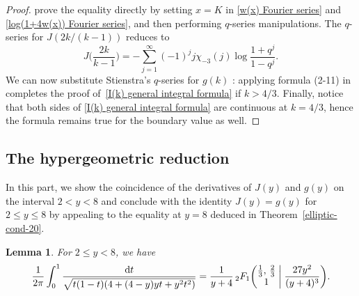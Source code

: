 \documentclass[12pt,reqno]{amsart}
\newtheorem{lemma}{Lemma}
\theoremstyle{remark}
\begin{document}
\begin{proof}
prove the equality directly by setting $x=K$ in \eqref{w(x)
Fourier series} and \eqref{log(1+4w(x)) Fourier series}, and then
performing $q$-series manipulations. The $q$-series for
$J(2k/(k-1))$ reduces to
\begin{equation*}
J\biggl(\frac{2k}{k-1}\biggr)
=-\sum_{j=1}^{\infty}(-1)^j j\chi_{-3}(j)\log\frac{1+q^j}{1-q^j}.
\end{equation*}
We can now substitute Stienstra's $q$-series for $g(k)$ \cite{St}:
applying formula (2-11) in~\cite{LR} completes the proof
of~\eqref{I(k) general integral formula} if $k>4/3$. Finally,
notice that both sides of \eqref{I(k) general integral formula}
are continuous at $k=4/3$, hence the formula remains true for the
boundary value as well.
\end{proof}

\subsection{The hypergeometric reduction}

In this part, we show the coincidence of the derivatives of $J(y)$
and $g(y)$ on the interval $2<y<8$ and conclude with the identity
$J(y)=g(y)$ for $2\le y\le 8$ by appealing to the equality at
$y=8$ deduced in Theorem~\ref{elliptic-cond-20}.

\begin{lemma}
\label{L1}
For $2\le y<8$, we have
\begin{equation}
\frac1{2\pi}\int_0^1\frac{{{\mathrm d}} t}{\sqrt{t(1-t)(4+(4-y)yt+y^2t^2)}}
=\frac1{y+4}\,{}_2F_1\biggl(\begin{matrix} \frac13, \, \frac23 \\
1 \end{matrix}\biggm| \frac{27y^2}{(y+4)^3} \biggr).
\label{T5}
\end{equation}
\end{lemma}
\end{document}
